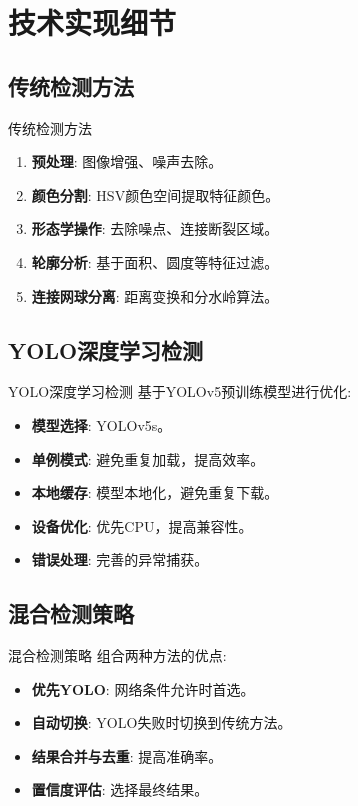 \documentclass{beamer}
\begin{document}
\section{技术实现细节}
\subsection{传统检测方法}
\begin{frame}{传统检测方法}
  \begin{enumerate}
    \item \textbf{预处理}: 图像增强、噪声去除。
    \item \textbf{颜色分割}: HSV颜色空间提取特征颜色。
    \item \textbf{形态学操作}: 去除噪点、连接断裂区域。
    \item \textbf{轮廓分析}: 基于面积、圆度等特征过滤。
    \item \textbf{连接网球分离}: 距离变换和分水岭算法。
  \end{enumerate}
\end{frame}

\subsection{YOLO深度学习检测}
\begin{frame}{YOLO深度学习检测}
  基于YOLOv5预训练模型进行优化:
  \begin{itemize}
    \item \textbf{模型选择}: YOLOv5s。
    \item \textbf{单例模式}: 避免重复加载，提高效率。
    \item \textbf{本地缓存}: 模型本地化，避免重复下载。
    \item \textbf{设备优化}: 优先CPU，提高兼容性。
    \item \textbf{错误处理}: 完善的异常捕获。
  \end{itemize}
\end{frame}

\subsection{混合检测策略}
\begin{frame}{混合检测策略}
  组合两种方法的优点:
  \begin{itemize}
    \item \textbf{优先YOLO}: 网络条件允许时首选。
    \item \textbf{自动切换}: YOLO失败时切换到传统方法。
    \item \textbf{结果合并与去重}: 提高准确率。
    \item \textbf{置信度评估}: 选择最终结果。
  \end{itemize}
\end{frame}
\end{document}
